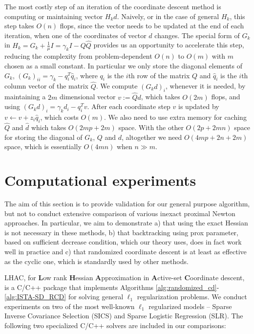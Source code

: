\documentclass[11pt]{article}
\numberwithin{equation}{section}
\begin{document}
The most costly step of an iteration of the coordinate descent method is computing or maintaining vector  $H_kd$. Naively, or in the case of general $H_k$, this step takes $O(n)$ flops, since the vector needs to be updated at the end of each iteration, when one of the coordinates of vector $d$ changes.  The special form of  $G_k$ in $H_k=G_k+\frac{1}{\mu} I=\gamma_kI-Q\hat Q$ provides us an opportunity to accelerate this step, reducing the complexity from problem-dependent $O(n)$ to $O(m)$ with $m$ chosen as a small constant. In particular we only store the diagonal elements of $G_k$, $(G_k)_{ii} = \gamma_k - q_i^T\hat q_i$, where $q_i$ is the $i$th row of the matrix $Q$ and $\hat q_i$ is the $i$th column vector of the matrix $\hat Q$. We compute $(G_kd)_i$,  whenever it is needed, by 
 maintaining a $2m$ dimensional vector $v := \hat Qd$, 
which takes $O(2m)$ flops, and using  $(G_kd)_i = \gamma_k d_i - q_i^T v$.
After each coordinate step $v$ is updated by $v \gets v + z_i \hat q_i$, which costs $O(m)$. We also need to use extra memory for caching $\hat Q$ and $\hat d$ which takes $O(2mp + 2m)$ space. With the other $O(2p + 2mn)$ space for storing the diagonal of $G_k$, $Q$ and $d$, altogether we need $O(4mp + 2n + 2m)$ space, which is essentially $O(4mn)$ when $n \gg m$.


\section{Computational experiments} %
\label{sec:comp}

The aim of this section is to provide validation for our general purpose algorithm, but not to conduct extensive comparison of various inexact proximal Newton approaches. 
In particular, we aim to demonstrate a) that using the exact Hessian is not necessary in these methods, b) that backtracking using prox parameter, based on sufficient decrease condition, which our theory uses, does in fact work well in practice and c) that randomized coordinate descent is at least as effective as the cyclic one, which is standardly used by other methods.

LHAC, for \textbf{L}ow rank \textbf{H}essian \textbf{A}pproximation in \textbf{A}ctive-set \textbf{C}oordinate descent, is a C/C++ package that implements Algorithms \ref{alg:randomized_cd}- \ref{alg:ISTA-SD_RCD} for solving general $\ell_1$ regularization problems. We conduct experiments on two of the most well-known $\ell_1$ regularized models -- Sparse Inverse Covariance Selection (SICS) and Sparse Logistic Regression (SLR). The following two specialized C/C++ solvers are included in our comparisons:
\end{document}
